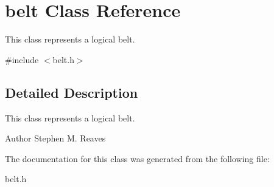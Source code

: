 \hypertarget{classbelt}{}\section{belt Class Reference}
\label{classbelt}


This class represents a logical belt.  




{\ttfamily \#include $<$belt.\+h$>$}



\subsection{Detailed Description}
This class represents a logical belt. 

\begin{DoxyAuthor}{Author}
Stephen M. Reaves 
\end{DoxyAuthor}


The documentation for this class was generated from the following file\+:\begin{DoxyCompactItemize}
\item 
belt.\+h\end{DoxyCompactItemize}
